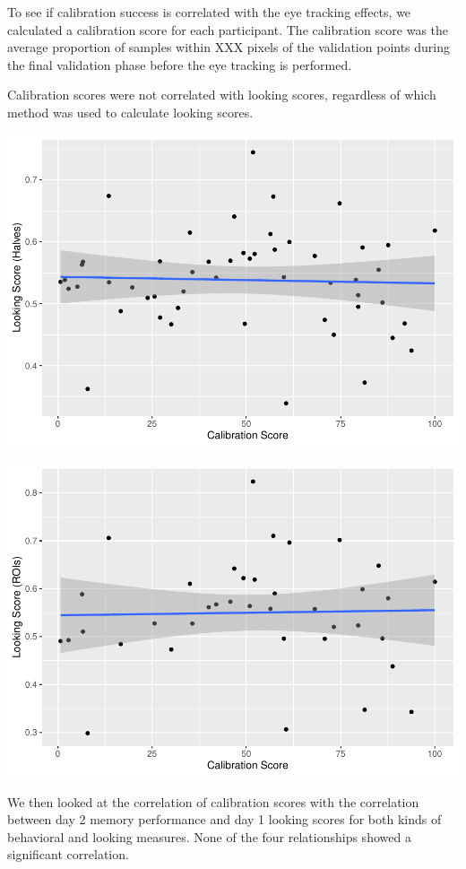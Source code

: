 \documentclass[
  man,floatsintext]{apa6}
\begin{document}
To see if calibration success is correlated with the eye tracking effects, we calculated a calibration score for each participant. The calibration score was the average proportion of samples within XXX pixels of the validation points during the final validation phase before the eye tracking is performed.

Calibration scores were not correlated with looking scores, regardless of which method was used to calculate looking scores.

\includegraphics{manuscript_files/figure-latex/E3-cal Plot looking score (halves) by calibration-1.pdf}

\includegraphics{manuscript_files/figure-latex/E3-cal Plot looking score (roi) by calibration-1.pdf}

We then looked at the correlation of calibration scores with the correlation between day 2 memory performance and day 1 looking scores for both kinds of behavioral and looking measures. None of the four relationships showed a significant correlation.
\end{document}
